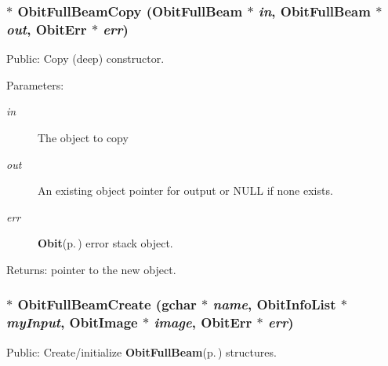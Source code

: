 \subsubsection{$\ast$ Obit\-Full\-Beam\-Copy ({\bf Obit\-Full\-Beam} $\ast$ {\em in}, {\bf Obit\-Full\-Beam} $\ast$ {\em out}, {\bf Obit\-Err} $\ast$ {\em err})}\label{ObitFullBeam_8h_a11}


Public: Copy (deep) constructor. 

\begin{Desc}
\item[Parameters:]
\begin{description}
\item[{\em in}]The object to copy \item[{\em out}]An existing object pointer for output or NULL if none exists. \item[{\em err}]{\bf Obit}{\rm (p.\,\pageref{structObit})} error stack object. \end{description}
\end{Desc}
\begin{Desc}
\item[Returns:]pointer to the new object. \end{Desc}
\subsubsection{$\ast$ Obit\-Full\-Beam\-Create (gchar $\ast$ {\em name}, {\bf Obit\-Info\-List} $\ast$ {\em my\-Input}, {\bf Obit\-Image} $\ast$ {\em image}, {\bf Obit\-Err} $\ast$ {\em err})}\label{ObitFullBeam_8h_a13}


Public: Create/initialize {\bf Obit\-Full\-Beam}{\rm (p.\,\pageref{structObitFullBeam})} structures. 

